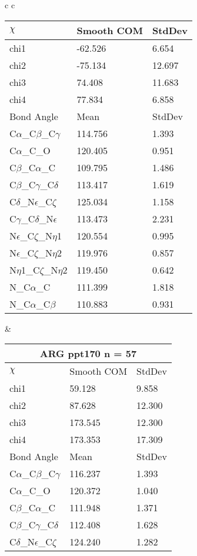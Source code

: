 \begin{longtable}{ c c }
\begin{tabular}{ l l l }
  $\chi$       & Smooth COM & StdDev \\ \midrule
  chi1 & -62.526 & 6.654 \\ 
  chi2 & -75.134 & 12.697 \\ 
  chi3 & 74.408 & 11.683 \\ 
  chi4 & 77.834 & 6.858 \\ \midrule
  Bond Angle   & Mean     & StdDev \\ \midrule
  C$\alpha$\_C$\beta$\_C$\gamma$ & 114.756 & 1.393\\
  C$\alpha$\_C\_O & 120.405 & 0.951\\
  C$\beta$\_C$\alpha$\_C & 109.795 & 1.486\\
  C$\beta$\_C$\gamma$\_C$\delta$ & 113.417 & 1.619\\
  C$\delta$\_N$\epsilon$\_C$\zeta$ & 125.034 & 1.158\\
  C$\gamma$\_C$\delta$\_N$\epsilon$ & 113.473 & 2.231\\
  N$\epsilon$\_C$\zeta$\_N$\eta$1 & 120.554 & 0.995\\
  N$\epsilon$\_C$\zeta$\_N$\eta$2 & 119.976 & 0.857\\
  N$\eta$1\_C$\zeta$\_N$\eta$2 & 119.450 & 0.642\\
  N\_C$\alpha$\_C & 111.399 & 1.818\\
  N\_C$\alpha$\_C$\beta$ & 110.883 & 0.931\\
  \bottomrule
  \end{tabular}
  &
  \begin{tabular}{ l l l }
  \toprule
  \multicolumn{3}{c}{ARG \textbf{ppt170} n = 57} \\ \toprule
  $\chi$       & Smooth COM & StdDev \\ \midrule
  chi1 & 59.128 & 9.858 \\ 
  chi2 & 87.628 & 12.300 \\ 
  chi3 & 173.545 & 12.300 \\ 
  chi4 & 173.353 & 17.309 \\ \midrule
  Bond Angle   & Mean     & StdDev \\ \midrule
  C$\alpha$\_C$\beta$\_C$\gamma$ & 116.237 & 1.393\\
  C$\alpha$\_C\_O & 120.372 & 1.040\\
  C$\beta$\_C$\alpha$\_C & 111.948 & 1.371\\
  C$\beta$\_C$\gamma$\_C$\delta$ & 112.408 & 1.628\\
  C$\delta$\_N$\epsilon$\_C$\zeta$ & 124.240 & 1.282\\

\end{tabular}
\end{longtable}
